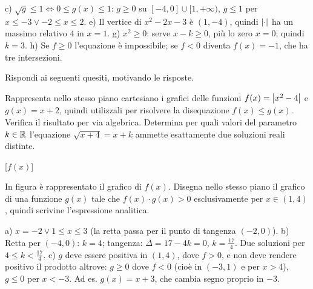 \documentclass[10pt]{article}
\begin{document}
{\begin{solution}
c) $\sqrt{g} \leq 1 \iff 0 \leq g(x) \leq 1$: $g \geq 0$ su $[-4, 0] \cup [1, +\infty)$, $g \leq 1$ per
$x \leq -3 \lor -2 \leq x \leq 2$.
e) Il vertice di $x^2-2x-3$ è $(1,-4)$, quindi $\left\vert \cdot \right\vert$ ha un massimo relativo $4$ in $x=1$.
g) $x^2 \geq 0$: serve $x - k \geq 0$, più lo zero $x = 0$; quindi $k = 3$.
h) Se $f \geq 0$ l'equazione è impossibile; se $f < 0$ diventa $f(x) = -1$, che ha tre intersezioni.
\end{solution}

\exercise Rispondi ai seguenti quesiti, motivando le risposte.

\begin{parts}[stretch=1.4]
  \itemx[pts=1.5, diff=2] Rappresenta nello stesso piano cartesiano i grafici delle funzioni $f(x) = \left\vert x^2 - 4 \right\vert$ e $g(x) = x + 2$, quindi utilizzali per risolvere la disequazione $f(x) \leq g(x)$. Verifica il risultato per via algebrica.
  \itemx[pts=1.5, diff=3, noreduced] Determina per quali valori del parametro $k \in \spR$ l'equazione $\sqrt{x + 4} = x + k$ ammette esattamente due soluzioni reali distinte.
\end{parts}

\smallskip
\noindent
\begin{minipage}[c]{.35\linewidth}
  \centering
  \begin{ftplot}[quiz, xmin=-4.9, xmax=5.9, ymin=-5.9, ymax=4.9, legend style={at={(0.4,0.97)}, anchor=north},
                 xtick distance=2, ytick distance=2, minor tick num=1]
    [$f(x)$]
  \end{ftplot}
\end{minipage}\hfill
\begin{minipage}[c]{.64\linewidth}
  \begin{parts}[ragged]
    \itemx[pts=1.5, diff=3] In figura è rappresentato il grafico di $f(x)$. Disegna nello stesso piano il grafico di una funzione $g(x)$ tale che $f(x) \cdot g(x) > 0$ esclusivamente per $x \in (1, 4)$, quindi scrivine l'espressione analitica.
  \end{parts}
\end{minipage}

\begin{solution}
a) $x = -2 \lor 1 \leq x \leq 3$ (la retta passa per il punto di tangenza $(-2,0)$).
b) Retta per $(-4,0)$: $k = 4$; tangenza: $\Delta = 17 - 4k = 0$, $k = \frac{17}{4}$. Due soluzioni per $4 \leq k < \frac{17}{4}$.
c) $g$ deve essere positiva in $(1, 4)$, dove $f > 0$, e non deve rendere positivo il prodotto
altrove: $g \geq 0$ dove $f < 0$ (cioè in $(-3, 1)$ e per $x > 4$), $g \leq 0$ per $x < -3$. Ad es.
$g(x) = x + 3$, che cambia segno proprio in $-3$.
\end{solution}

}
\end{document}
